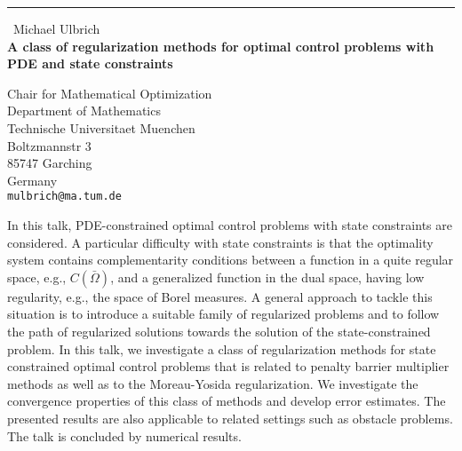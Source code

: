 \documentclass{report}
\begin{document}
\begin{center}
\rule{6in}{1pt} \
{\large Michael Ulbrich \\
{\bf A class of regularization methods for optimal control problems with PDE and state constraints }}

Chair for Mathematical Optimization \\ Department of Mathematics \\ Technische Universitaet Muenchen \\ Boltzmannstr 3 \\ 85747 Garching \\ Germany
\\
{\tt mulbrich@ma.tum.de}\end{center}

In this talk, PDE-constrained optimal control problems with state
constraints are considered. A particular difficulty with state
constraints is that the optimality system contains complementarity
conditions between a function in a quite regular space, e.g.,
$C(\bar\Omega)$, and a generalized function in the dual space, having low
regularity, e.g., the space of Borel measures.
A general approach to tackle this situation is to introduce a suitable
family of regularized problems and to follow the path of regularized
solutions towards the solution of the state-constrained problem.
In this talk, we investigate a class of regularization methods for state
constrained optimal control problems that is related to penalty barrier
multiplier methods as well as to the Moreau-Yosida regularization.
We investigate the convergence properties of this class of methods and
develop error estimates. The presented results are also applicable to
related settings such as obstacle problems. The talk is concluded by
numerical results.
\end{document}
